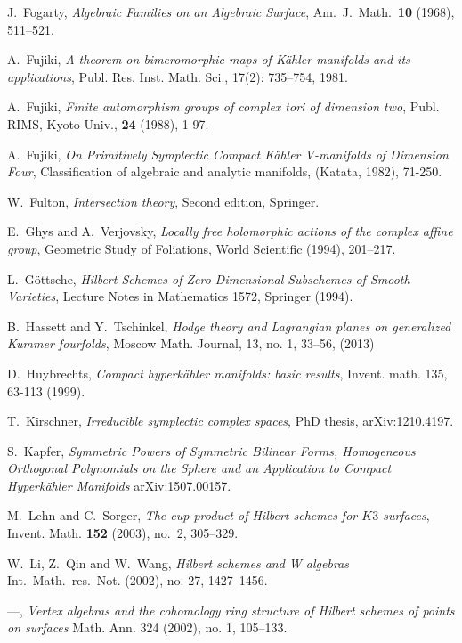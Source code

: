 \begin{thebibliography}{10}
J.~Fogarty, \emph{Algebraic Families on an Algebraic Surface},
  Am.~J.~Math.~\textbf{10} (1968), 511--521.

A.~Fujiki,
\emph{A theorem on bimeromorphic maps of K\"ahler manifolds and its applications},
Publ. Res. Inst. Math. Sci., 
17(2): 735--754, 1981.

A.~Fujiki, \emph{Finite automorphism groups of complex tori of dimension two}, Publ. RIMS,
  Kyoto Univ., \textbf{24} (1988), 1-97.

A.~Fujiki,
\emph{On Primitively Symplectic Compact K\"ahler V-manifolds of Dimension Four},
Classification of algebraic and analytic manifolds, 
(Katata, 1982), 71-250.

W.~Fulton,
\emph{Intersection theory},
Second edition, Springer.

E.~Ghys and A.~Verjovsky, \emph{Locally free holomorphic actions of the complex affine group},
  Geometric Study of Foliations, World Scientific (1994), 201--217.

L.~G\"ottsche, \emph{Hilbert Schemes of Zero-Dimensional Subschemes of Smooth Varieties},
  Lecture Notes in Mathematics 1572, Springer (1994).

B.~Hassett and Y.~Tschinkel, \emph{ Hodge theory and Lagrangian planes on 
  generalized Kummer fourfolds}, Moscow Math. Journal, 13, no. 1, 33--56, (2013) 

D.~Huybrechts,
\emph{ Compact hyperk\"ahler manifolds: basic results},
Invent. math. 
135, 63-113 (1999).

T.~Kirschner, 
\emph{Irreducible symplectic complex spaces},
PhD thesis, arXiv:1210.4197.
  
S.~Kapfer, \emph{Symmetric Powers of Symmetric Bilinear Forms, Homogeneous Orthogonal Polynomials 
  on the Sphere and an Application to Compact Hyperk\"ahler Manifolds} arXiv:1507.00157.
  
M.~Lehn and C.~Sorger, \emph{The cup product of Hilbert schemes for {$K3$}
  surfaces}, Invent. Math. \textbf{152} (2003), no.~2, 305--329.

W.~Li, Z.~Qin and W.~Wang, \emph{Hilbert schemes and W algebras} Int.~Math.~res.~Not. (2002),
  no. 27, 1427--1456.

---, \emph{Vertex algebras and the cohomology ring structure of 
  Hilbert schemes of points on surfaces} Math. Ann. 324 (2002), no. 1, 105--133.  
  

\end{thebibliography}
